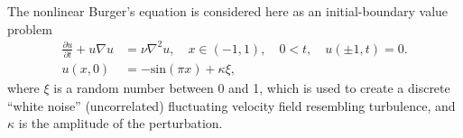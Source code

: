 The nonlinear Burger's equation is considered here as an
initial-boundary value problem
\begin{align}
 \frac{\partial u}{\partial t}+u\nabla u &= \nu \nabla^2 u, \quad x \in (-1,1), \quad 0<t, \quad u(\pm 1,t)=0. \\
 u(x,0) &=-\text{sin}(\pi x)+\kappa \xi,
\label{eq:mortensen:burgers}
\end{align}
where $\xi$ is a random number between 0 and 1, which is used to create a
discrete ``white noise'' (uncorrelated) fluctuating velocity field resembling turbulence, and $\kappa$ is the amplitude of the perturbation. %

